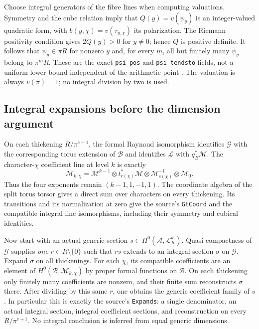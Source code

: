 Choose integral generators of the fibre lines when computing
valuations.  Symmetry and the cube relation imply that
$Q(y)=v(\psi_y)$ is an integer-valued quadratic form, with
$b(y,\chi)=v(\tau_{y,\chi})$ its polarization.  The Riemann
positivity condition gives $2Q(y)>0$ for $y\ne0$; hence $Q$ is
positive definite.  It follows that $\psi_y\in\pi R$ for nonzero
$y$ and, for every $m$, all but finitely many $\psi_y$ belong to
$\pi^mR$.  These are the exact \texttt{psi\_pos} and
\texttt{psi\_tendsto} fields, not a uniform lower bound independent
of the arithmetic point
\cite[Definitions 4.2.1.10--11 and Theorem 4.2.1.14]{dvr-unif-lan}.
The valuation is always $v(\pi)=1$; no integral division by two is used.

\subsection*{Integral expansions before the dimension argument}

On each thickening $R/\pi^{e+1}$, the formal Raynaud isomorphism
identifies $\mathcal G$ with the corresponding torus extension of
$\mathcal B$ and identifies $\mathscr L$ with $q_B^*\mathscr M$.
The character-$\chi$ coefficient line at level $k$ is exactly
\[
 \mathscr M_{k,\chi}
 =\mathscr M^{k-1}\otimes t_{c(\chi)}^*\mathscr M
        \otimes\mathscr M_{c(\chi)}^{-1}\otimes\mathscr M_0.
\]
Thus the four exponents remain $(k-1,1,-1,1)$.  The coordinate
algebra of the split torus torsor gives a direct sum over characters
on every thickening.  Its transitions and its normalization at zero
give the source's \texttt{GtCoord} and the compatible integral line
isomorphisms, including their symmetry and cubical identities.

Now start with an actual generic section
$s\in H^0(\mathcal A,\mathscr L_K^k)$.  Quasi-compactness of
$\mathcal G$ supplies \emph{one} $r\in R\setminus\{0\}$ such that
$r s$ extends to an integral section $\sigma$ on $\mathcal G$.
Expand $\sigma$ on all thickenings.  For each $\chi$, its compatible
coefficients are an element of
$H^0(\mathcal B,\mathscr M_{k,\chi})$ by proper formal functions on
$\mathcal B$.  On each thickening only finitely many coefficients
are nonzero, and their finite sum reconstructs $\sigma$ there.
After dividing by this same $r$, one obtains the generic coefficient
family of $s$.  In particular this is exactly the source's
\texttt{Expands}: a single denominator, an actual integral section,
integral coefficient sections, and reconstruction on every
$R/\pi^{e+1}$.  No integral conclusion is inferred from equal generic
dimensions\cite[Section 4.3.1]{dvr-unif-lan}.

